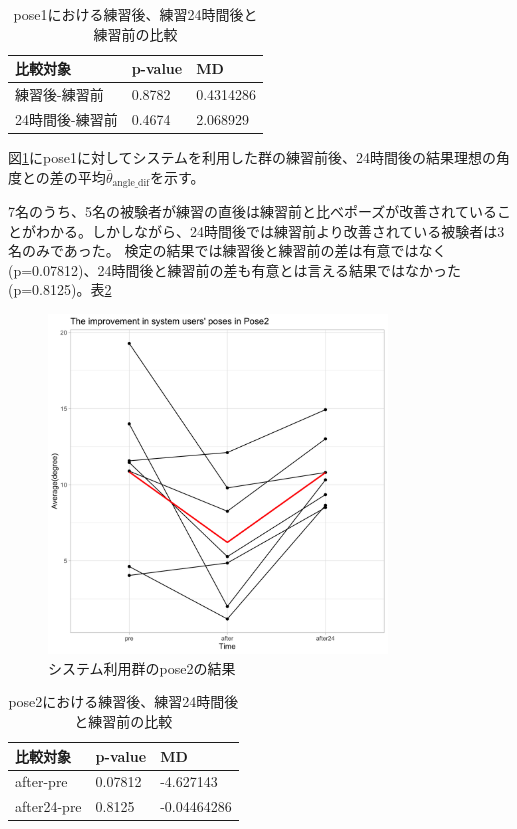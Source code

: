 \begin{table}[h]
  \centering
  \caption{pose1における練習後、練習24時間後と練習前の比較}
  \begin{tabular}{|l|l|l|}
  \hline
  \textbf{比較対象} & \textbf{p-value} & \textbf{MD} \\ \hline
  練習後-練習前 & 0.8782 & 0.4314286 \\ \hline
  24時間後-練習前 & 0.4674 & 2.068929 \\ \hline
  \end{tabular}
  \label{table:pose1_system_p_value}
  \end{table}

  図\ref{fig:pose2_system}にpose1に対してシステムを利用した群の練習前後、24時間後の結果理想の角度との差の平均\(\bar{\theta}_{\text{angle\_dif}}\)を示す。


7名のうち、5名の被験者が練習の直後は練習前と比べポーズが改善されていることがわかる。しかしながら、24時間後では練習前より改善されている被験者は3名のみであった。
検定の結果では練習後と練習前の差は有意ではなく(p=0.07812)、24時間後と練習前の差も有意とは言える結果ではなかった(p=0.8125)。表\ref{table:pose2_system_p_value}
\begin{figure}[H]
  \begin{center}
  \includegraphics[width=9cm]{figures/pose2_system_true_graph.png}
  \caption{システム利用群のpose2の結果}
  \label{fig:pose2_system}
  \end{center}
\end{figure}

\begin{table}[h]
  \centering
  \caption{pose2における練習後、練習24時間後と練習前の比較}
  \begin{tabular}{|l|l|l|}
  \hline
  \textbf{比較対象} & \textbf{p-value} & \textbf{MD} \\ \hline
  after-pre & 0.07812 & -4.627143 \\ \hline
  after24-pre & 0.8125 & -0.04464286 \\ \hline
  \end{tabular}
  \label{table:pose2_system_p_value}
  \end{table}
